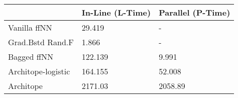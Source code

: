 \begin{tabular}{lll}
\toprule
{} & In-Line (L-Time) & Parallel (P-Time) \\
\midrule
Vanilla ffNN       &           29.419 &                 - \\
Grad.Bstd Rand.F   &            1.866 &                 - \\
Bagged ffNN        &          122.139 &             9.991 \\
Architope-logistic &          164.155 &            52.008 \\
Architope          &          2171.03 &           2058.89 \\
\bottomrule
\end{tabular}
